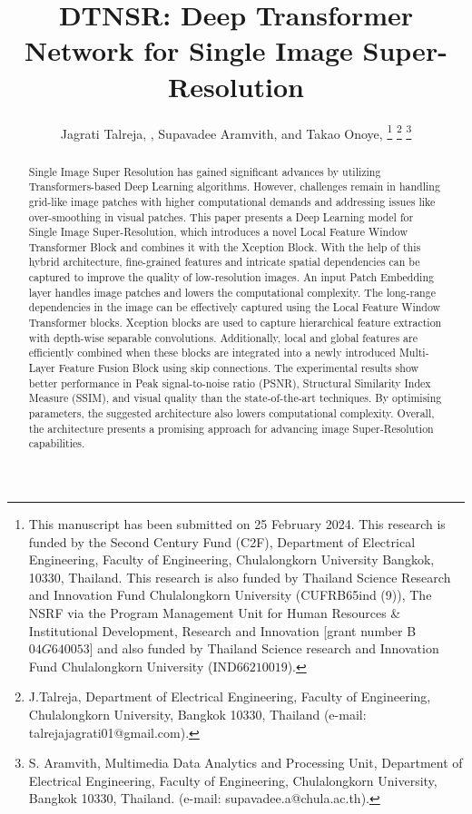 \documentclass[journal]{IEEEtran}
\begin{document}
\title{DTNSR: Deep Transformer Network for Single Image Super-Resolution}

\author{Jagrati Talreja, , Supavadee Aramvith,  and Takao Onoye, 
\thanks{This manuscript has been submitted on 25 February 2024. This research is funded by the Second Century Fund (C2F), Department of Electrical Engineering, Faculty of Engineering, Chulalongkorn University Bangkok, 10330, Thailand. This research is also funded by Thailand Science Research and Innovation Fund Chulalongkorn University (CU\textunderscore FRB65\textunderscore ind (9)), The NSRF via the Program Management Unit for Human Resources \& Institutional Development, Research and Innovation [grant number B$04G640053$] and also funded by Thailand Science research and Innovation Fund Chulalongkorn University (IND$66210019$).}
\thanks{J.Talreja, Department of Electrical Engineering, Faculty of Engineering, Chulalongkorn University, Bangkok 10330, Thailand (e-mail: talrejajagrati01@gmail.com).}
\thanks{S. Aramvith, Multimedia Data Analytics and Processing Unit, Department of Electrical Engineering, Faculty of Engineering, Chulalongkorn University, Bangkok 10330, Thailand. (e-mail: supavadee.a@chula.ac.th).}}

\maketitle

\begin{abstract}
Single Image Super Resolution has gained significant advances by utilizing Transformers-based Deep Learning algorithms. However, challenges remain in handling grid-like image patches with higher computational demands and addressing issues like over-smoothing in visual patches. This paper presents a Deep Learning model for Single Image Super-Resolution, which introduces a novel Local Feature Window Transformer Block and combines it with the Xception Block. With the help of this hybrid architecture, fine-grained features and intricate spatial dependencies can be captured to improve the quality of low-resolution images. An input Patch Embedding layer handles image patches and lowers the computational complexity. The long-range dependencies in the image can be effectively captured using the Local Feature Window Transformer blocks. Xception blocks are used to capture hierarchical feature extraction with depth-wise separable convolutions. Additionally, local and global features are efficiently combined when these blocks are integrated into a newly introduced Multi-Layer Feature Fusion Block using skip connections. The experimental results show better performance in Peak signal-to-noise ratio (PSNR), Structural Similarity Index Measure (SSIM), and visual quality than the state-of-the-art techniques. By optimising parameters, the suggested architecture also lowers computational complexity. Overall, the architecture presents a promising approach for advancing image Super-Resolution capabilities.
\end{abstract}
\end{document}

